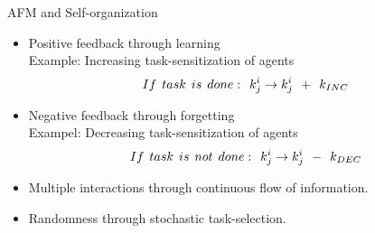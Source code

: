 \documentclass[handout,draft]{beamer}
\begin{document}
\begin{frame}[t]{AFM and Self-organization}
  \begin{itemize}
    \item \alert{Positive feedback} through learning\\ Example: Increasing task-sensitization of agents
\begin{equation}
 If\hspace*{0.15cm}task\hspace*{0.15cm}is\hspace*{0.15cm}done:\hspace*{0.15cm}  k^i_j \rightarrow   k^i_j \hspace*{0.15cm} + \hspace*{0.15cm} k_{INC}
\label{eqn:k-inc}
\end{equation} 
    \item \alert{Negative feedback} through forgetting\\ Exampel: Decreasing task-sensitization of agents
\begin{equation}
 If\hspace*{0.15cm}task\hspace*{0.15cm}is\hspace*{0.15cm}not\hspace*{0.15cm}done:\hspace*{0.15cm}  k^i_j \rightarrow   k^i_j \hspace*{0.15cm} - \hspace*{0.15cm} k_{DEC}
\label{eqn:k-dec}
\end{equation}   	
	\item \alert{Multiple interactions} through continuous flow of information.
	
	\item \alert{Randomness} through stochastic task-selection.
    \end{itemize}
\end{frame}
\end{document}
